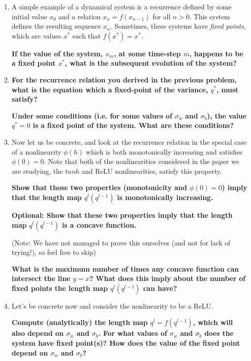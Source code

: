 \documentclass[a4paper]{article}
\begin{document}
\begin{enumerate}[label=(\alph*)]
\item A simple example of a dynamical system is a recurrence defined by some initial value $x_0$ and a relation $x_n = f(x_{n-1})$ for all $n>0$.  This system defines the resulting sequence $x_n$.  Sometimes, these systems have \emph{fixed points}, which are values $x^*$ such that $f(x^*) = x^*$.

\textbf{If the value of the system, $x_m$, at some time-step $m$, happens to be a fixed point $x^*$, what is the subsequent evolution of the system?}

\item \textbf{For the recurrence relation you derived in the previous problem, what is the equation which a fixed-point of the variance, $q^*$, must satisfy?}  

\textbf{Under some conditions (i.e. for some values of $\sigma_w$ and $\sigma_b$), the value $q^*=0$ is a fixed point of the system.  What are these conditions?}

\item Now let us be concrete, and look at the recurrence relation in the special case of a nonlinearity $\phi(h)$ which is both monotonically increasing and satisfies $\phi(0) = 0$.  Note that both of the nonlinearities considered in the paper we are studying, the $tanh$ and ReLU nonlinearities, satisfy this property.  

\textbf{Show that those two properties (monotonicity and $\phi(0)=0$) imply that the length map $q^l(q^{l-1})$ is monotonically increasing.}

\textbf{Optional: Show that these two properties imply that the length map $q^l(q^{l-1})$ is a concave function.} 

(Note: We have not managed to prove this ourselves (and not for lack of trying!), so feel free to skip)

\textbf{What is the maximum number of times any concave function can intersect the line $y = x$?  What does this imply about the number of fixed points the length map $q^l(q^{l-1})$ can have?}

\item Let's be concrete now and consider the nonlinearity to be a ReLU.  

\textbf{Compute (analytically) the length map $q^l = f(q^{l-1})$, which will also depend on $\sigma_w$ and $\sigma_b$.  For what values of $\sigma_w$ and $\sigma_b$ does the system have fixed point(s)? How does the value of the fixed point depend on $\sigma_w$ and $\sigma_b$? }



\end{enumerate}
\end{document}
